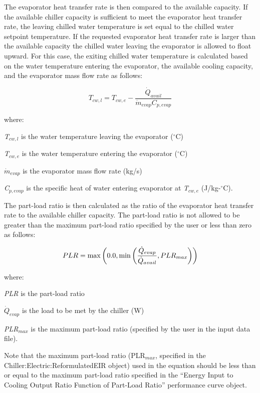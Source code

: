 The evaporator heat transfer rate is then compared to the available capacity. If the available chiller capacity is sufficient to meet the evaporator heat transfer rate, the leaving chilled water temperature is set equal to the chilled water setpoint temperature. If the requested evaporator heat transfer rate is larger than the available capacity the chilled water leaving the evaporator is allowed to float upward. For this case, the exiting chilled water temperature is calculated based on the water temperature entering the evaporator, the available cooling capacity, and the evaporator mass flow rate as follows:

\begin{equation}
  T_{cw,l}  =  T_{cw,e} - \frac{\dot{Q}_{avail}}{\dot{m}_{evap}C_{p,evap}}
\end{equation}

where:

\emph{T\(_{cw,l}\)} is the water temperature leaving the evaporator (\(^{\circ}\)C)

\emph{T\(_{cw,e}\)} is the water temperature entering the evaporator (\(^{\circ}\)C)

\({\dot{m}_{evap}}\) is the evaporator mass flow rate (kg/s)

\emph{C\(_{p,evap}\)} is the specific heat of water entering evaporator at \emph{T\(_{cw,e}\)} (J/kg-\(^{\circ}\)C).

The part-load ratio is then calculated as the ratio of the evaporator heat transfer rate to the available chiller capacity. The part-load ratio is not allowed to be greater than the maximum part-load ratio specified by the user or less than zero as follows:

\begin{equation}
  PLR = \max\left(0.0,\min\left(\frac{\dot{Q}_{evap}}{\dot{Q}_{avail}},PLR_{max}\right)\right)
\end{equation}

where:

\emph{PLR} is the part-load ratio

\({\dot{Q}_{evap}}\) is the load to be met by the chiller (W)

\emph{PLR\(_{max}\)} is the maximum part-load ratio (specified by the user in the input data file).

Note that the maximum part-load ratio (PLR\(_{max}\), specified in the Chiller:Electric:ReformulatedEIR object) used in the equation should be less than or equal to the maximum part-load ratio specified in the ``Energy Input to Cooling Output Ratio Function of Part-Load Ratio'' performance curve object.

